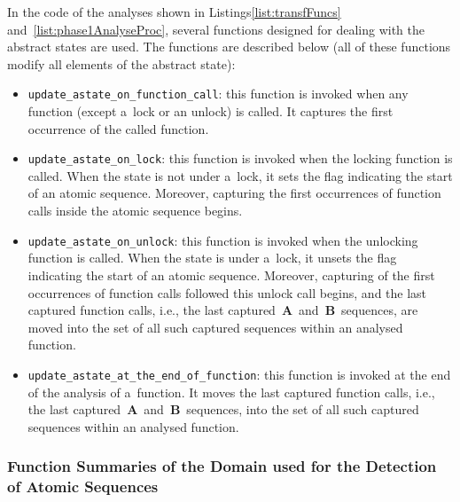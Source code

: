 In the code of the analyses shown in Listings\ref{list:transfFuncs} 
and~\ref{list:phase1AnalyseProc}, several functions designed for dealing 
with the abstract states are used. The functions are described below 
(all of these functions modify all elements of the abstract state):
\begin{itemize}
    \item
        \texttt{update\_astate\_on\_function\_call}: this function is 
        invoked when any function (except a~lock or an unlock) is called. 
        It captures the first occurrence of the called function.

    \item
        \texttt{update\_astate\_on\_lock}: this function is invoked when 
        the locking function is called. When the state is not under a~lock, 
        it sets the flag indicating the start of an atomic sequence. Moreover,
        capturing the first occurrences of function calls inside the atomic
        sequence begins.

    \item
        \texttt{update\_astate\_on\_unlock}: this function is invoked when 
        the unlocking function is called. When the state is under a~lock, 
        it unsets the flag indicating the start of an atomic sequence. 
        Moreover, capturing of the first occurrences of function calls 
        followed this unlock call begins, and the last captured function 
        calls, i.e., the last captured~\textbf{A}~and~\textbf{B}~sequences, 
        are moved into the set of all such captured sequences within an
        analysed function.

    \item
        \texttt{update\_astate\_at\_the\_end\_of\_function}: this function 
        is invoked at the end of the analysis of a~function. It moves
        the last captured function calls, i.e., the last
        captured~\textbf{A}~and~\textbf{B}~sequences, into the set
        of all such captured sequences within an analysed function.
\end{itemize}

\subsubsection{%
    Function Summaries of the Domain used for the Detection of Atomic 
    Sequences
}

